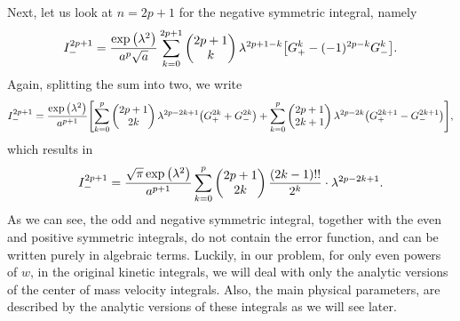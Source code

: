 \documentclass[aps,prl,preprint,groupedaddress,10pt]{revtex4-2}
\begin{document}
Next, let us look at $n=2p+1$ for the negative symmetric integral, namely
\begin{equation}
    I^{2p+1}_{-}=\frac{\exp\pqty{\lambda^2}}{a^p\sqrt{a}}\sum_{k=0}^{2p+1}\pmqty{2p+1\\k}\lambda^{2p+1-k}
    \bqty{G^{k}_{+}-(-1)^{2p-k}G^{k}_{-}}.
\end{equation}
Again, splitting the sum into two, we write
\begin{equation}
    I^{2p+1}_{-}=\frac{\exp\pqty{\lambda^2}}{a^{p+1}}
    \bqty{\sum_{k=0}^{p}\pmqty{2p+1\\2k}\lambda^{2p-2k+1}\pqty{G^{2k}_{+}+G^{2k}_{-}}+
    \sum_{k=0}^{p}\pmqty{2p+1\\2k+1}\lambda^{2p-2k}\pqty{G^{2k+1}_{+}-G^{2k+1}_{-}}},
\end{equation}
which results in
\begin{equation}\label{eq:symmetric_negative_odd_integral}
    I^{2p+1}_{-}=\frac{\sqrt{\pi}\exp\pqty{\lambda^2}}{a^{p+1}}\sum_{k=0}^{p}
    \pmqty{2p+1\\2k}\frac{(2k-1)!!}{2^{k}}\cdot\lambda^{2p-2k+1}.
\end{equation}
As we can see, the odd and negative symmetric integral, together with the even and positive symmetric
integrals, do not contain the error function, and can be written purely in algebraic terms.
Luckily, in our problem, for only even powers of $w$, in the original kinetic integrals, we will deal
with only the analytic versions of the center of mass velocity integrals. Also, the main physical
parameters, are described by the analytic versions of these integrals as we will see later.
\end{document}
